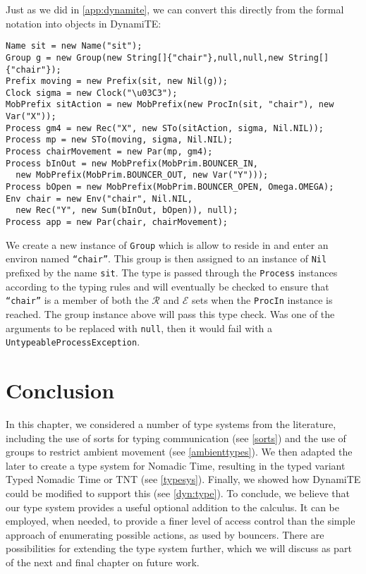 Just as we did in \ref{app:dynamite}, we can convert this directly
from the formal notation into objects in DynamiTE:

\begin{verbatim}
Name sit = new Name("sit");
Group g = new Group(new String[]{"chair"},null,null,new String[]{"chair"}); 
Prefix moving = new Prefix(sit, new Nil(g));
Clock sigma = new Clock("\u03C3");
MobPrefix sitAction = new MobPrefix(new ProcIn(sit, "chair"), new Var("X"));
Process gm4 = new Rec("X", new STo(sitAction, sigma, Nil.NIL));
Process mp = new STo(moving, sigma, Nil.NIL);
Process chairMovement = new Par(mp, gm4);
Process bInOut = new MobPrefix(MobPrim.BOUNCER_IN,
  new MobPrefix(MobPrim.BOUNCER_OUT, new Var("Y")));
Process bOpen = new MobPrefix(MobPrim.BOUNCER_OPEN, Omega.OMEGA);
Env chair = new Env("chair", Nil.NIL,
  new Rec("Y", new Sum(bInOut, bOpen)), null);
Process app = new Par(chair, chairMovement);
\end{verbatim} 

\noindent We create a new instance of \texttt{Group} which is allow to
reside in and enter an environ named \texttt{``chair''}.  This group
is then assigned to an instance of \texttt{Nil} prefixed by the name
\texttt{sit}.  The type is passed through the \texttt{Process}
instances according to the typing rules and will eventually be checked
to ensure that \texttt{``chair''} is a member of both the
$\mathscr{R}$ and $\mathscr{E}$ sets when the \texttt{ProcIn} instance
is reached.  The group instance above will pass this type check.  Was
one of the arguments to be replaced with \texttt{null}, then it would
fail with a \texttt{UntypeableProcessException}.

\section{Conclusion}

In this chapter, we considered a number of type systems from the
literature, including the use of sorts for typing communication (see
\ref{sorts}) and the use of groups to restrict ambient movement (see
\ref{ambienttypes}).  We then adapted the later to create a type
system for Nomadic Time, resulting in the typed variant Typed Nomadic
Time or TNT (see \ref{typesys}). Finally, we showed how DynamiTE could
be modified to support this (see \ref{dyn:type}).  To conclude, we
believe that our type system provides a useful optional addition to
the calculus.  It can be employed, when needed, to provide a finer
level of access control than the simple approach of enumerating
possible actions, as used by bouncers.  There are possibilities for
extending the type system further, which we will discuss as part of
the next and final chapter on future work.
